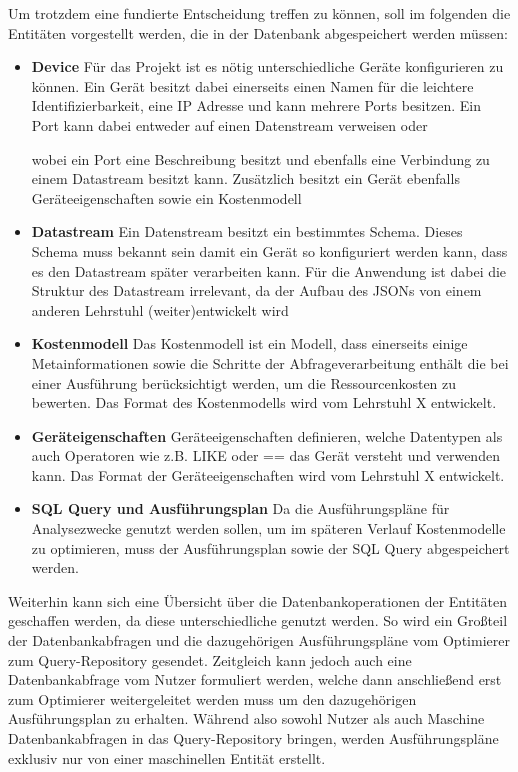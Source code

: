 Um  trotzdem eine fundierte Entscheidung treffen zu können, soll im folgenden die Entitäten vorgestellt werden, die in der Datenbank abgespeichert werden müssen:
\begin{itemize}
	\item \textbf{Device} \newline
	Für das Projekt ist es nötig unterschiedliche Geräte konfigurieren zu können. Ein Gerät besitzt dabei einerseits einen Namen für die leichtere Identifizierbarkeit, eine IP Adresse und kann mehrere Ports besitzen. Ein Port kann dabei entweder auf einen Datenstream verweisen oder 
	
	
	 wobei ein Port eine Beschreibung besitzt und ebenfalls eine Verbindung zu einem Datastream besitzt kann. Zusätzlich besitzt ein Gerät ebenfalls Geräteeigenschaften sowie ein Kostenmodell
	\item \textbf{Datastream} \newline
	Ein Datenstream besitzt ein bestimmtes Schema. Dieses Schema muss bekannt sein damit ein Gerät so konfiguriert werden kann, dass es den Datastream später verarbeiten kann. Für die Anwendung ist dabei die Struktur des Datastream irrelevant, da der Aufbau des JSONs von einem anderen Lehrstuhl (weiter)entwickelt wird
	\item \textbf{Kostenmodell} \newline
	Das Kostenmodell ist ein Modell, dass einerseits einige Metainformationen sowie die Schritte der Abfrageverarbeitung enthält die bei einer Ausführung berücksichtigt werden, um die Ressourcenkosten zu bewerten. Das Format des Kostenmodells wird vom Lehrstuhl X entwickelt.
	\item \textbf{Geräteigenschaften} \newline
	Geräteeigenschaften definieren, welche Datentypen als auch Operatoren wie z.B. LIKE oder == das Gerät versteht und verwenden kann. Das Format der Geräteeigenschaften wird vom Lehrstuhl X entwickelt.
	\item \textbf{SQL Query und Ausführungsplan} \newline
	Da die Ausführungspläne für Analysezwecke genutzt werden sollen, um im späteren Verlauf Kostenmodelle zu optimieren, muss der Ausführungsplan sowie der SQL Query abgespeichert werden.
\end{itemize}
Weiterhin kann sich eine Übersicht über die Datenbankoperationen der Entitäten geschaffen werden, da diese unterschiedliche genutzt werden.
So wird ein Großteil der Datenbankabfragen und die dazugehörigen Ausführungspläne vom Optimierer zum Query-Repository gesendet. 
Zeitgleich kann jedoch auch eine Datenbankabfrage vom Nutzer formuliert werden, welche dann anschließend erst zum Optimierer weitergeleitet werden muss um den dazugehörigen Ausführungsplan zu erhalten. Während also sowohl Nutzer als auch Maschine Datenbankabfragen in das Query-Repository bringen, werden Ausführungspläne exklusiv nur von einer maschinellen Entität erstellt.

